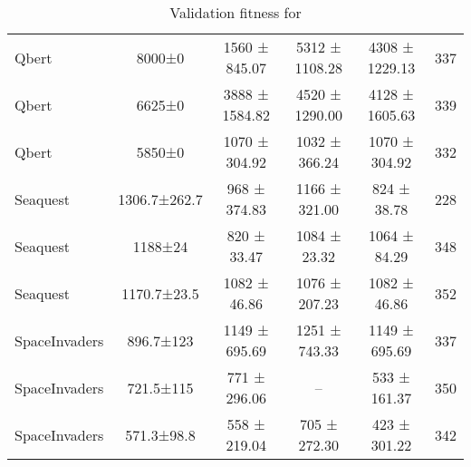 \begin{table}[H]
\begin{small}
\begin{center}
\begin{tabular}{l|c|cc|cc|}
\hline
        Qbert &        8000±0 &  1560 ± 845.07 & 5312 ± 1108.28 & 4308 ± 1229.13 &         337 \\
        Qbert &        6625±0 & 3888 ± 1584.82 & 4520 ± 1290.00 & 4128 ± 1605.63 &         339 \\
        Qbert &        5850±0 &  1070 ± 304.92 &  1032 ± 366.24 &  1070 ± 304.92 &         332 \\
\hline
        Seaquest &  1306.7±262.7 &   968 ± 374.83 &  1166 ± 321.00 &    824 ± 38.78 &         228 \\
        Seaquest &       1188±24 &    820 ± 33.47 &   1084 ± 23.32 &   1064 ± 84.29 &         348 \\
        Seaquest &   1170.7±23.5 &   1082 ± 46.86 &  1076 ± 207.23 &   1082 ± 46.86 &         352 \\
\hline
SpaceInvaders &     896.7±123 &  1149 ± 695.69 &  1251 ± 743.33 &  1149 ± 695.69 &         337 \\
SpaceInvaders &     721.5±115 &   771 ± 296.06 &             -- &   533 ± 161.37 &         350 \\
SpaceInvaders &    571.3±98.8 &   558 ± 219.04 &   705 ± 272.30 &   423 ± 301.22 &         342 \\

\end{tabular}
\caption{Validation fitness for \canonical{}}
\label{tab:berl_canonical}
\end{center}
\end{small}
\end{table}
